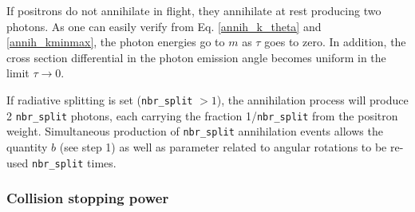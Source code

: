 If positrons do not annihilate in flight, they 
annihilate at rest producing two photons. As one can easily 
verify from Eq. \eqref{annih_k_theta} and \eqref{annih_kminmax}, 
the photon energies go to $m$ as $\tau$ goes to zero. 
In addition, the cross section differential in the 
photon emission angle becomes uniform in the limit $\tau \to 0$. 

If radiative splitting is set ({\tt nbr\_split} $> 1$), 
the annihilation process will produce 2 {\tt nbr\_split} photons, 
each carrying the fraction 1/{\tt nbr\_split} from the positron weight. 
Simultaneous production of {\tt nbr\_split} annihilation 
events allows the quantity $b$ (see step 1) as well as 
parameter related to angular rotations to be re-used 
{\tt nbr\_split} times. 

\subsubsection{Collision stopping power}
\label{stopping_power}
\setcounter{equation}{0}

